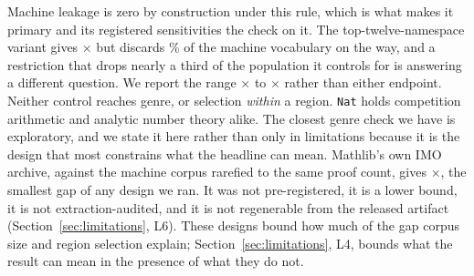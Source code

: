 Machine leakage is zero by construction under this rule, which is what makes
it primary and its registered sensitivities the check on it. The
top-twelve-namespace variant gives \areaTopTwelveRatio{}$\times$ but discards
\areaTopTwelveMachineLeakPct{}\% of the machine vocabulary on the way, and a
restriction that drops nearly a third of the population it controls for is
answering a different question. We report the range
\areaTopTwelveRatio{}$\times$ to \areaRestrictedRatio{}$\times$ rather than
either endpoint. Neither control reaches genre, or selection \emph{within} a
region. \texttt{Nat} holds competition arithmetic and analytic number theory
alike. The closest genre check we have is exploratory, and we state it here rather than
only in limitations because it is the design that most constrains what the
headline can mean. Mathlib's own IMO archive, against the machine corpus
rarefied to the same proof count, gives \genreCheckRatio{}$\times$, the
smallest gap of any design we ran. It was not pre-registered, it is a lower
bound, it is not extraction-audited, and it is not regenerable from the
released artifact (Section~\ref{sec:limitations}, L6). These designs bound how much of the gap corpus size and region selection
explain; Section~\ref{sec:limitations}, L4, bounds what the result can mean in
the presence of what they do not.
